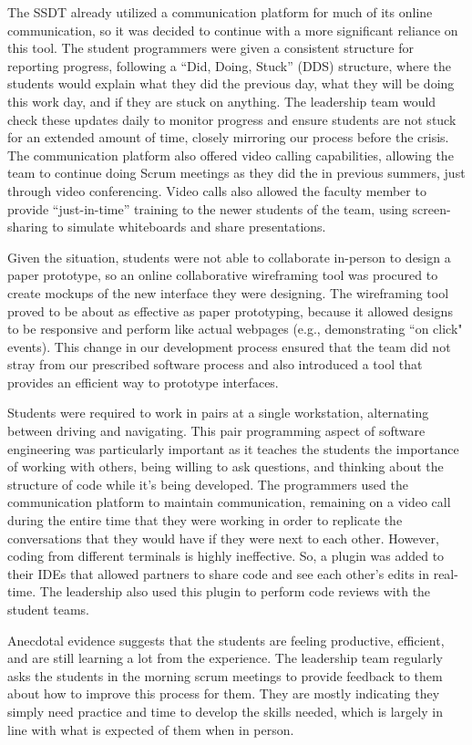The SSDT already utilized a communication platform for much of its online communication, so it was decided to continue with a more significant reliance on this tool. The student programmers were given a consistent structure for reporting progress, following a ``Did, Doing, Stuck'' (DDS) structure, where the students would explain what they did the previous day, what they will be doing this work day, and if they are stuck on anything. The leadership team would check these updates daily to monitor progress and ensure students are not stuck for an extended amount of time, closely mirroring our process before the crisis. The communication platform also offered video calling capabilities, allowing the team to continue doing Scrum meetings as they did the in previous summers, just through video conferencing. Video calls also allowed the faculty member to provide ``just-in-time'' training to the newer students of the team, using screen-sharing to simulate whiteboards and share presentations.

Given the situation, students were not able to collaborate in-person to design a paper prototype, so an online collaborative wireframing tool was procured to create mockups of the new interface they were designing. The wireframing tool proved to be about as effective as paper prototyping, because it allowed designs to be responsive and perform like actual webpages (e.g., demonstrating ``on click" events). This change in our development process ensured that the team did not stray from our prescribed software process and also introduced a tool that provides an efficient way to prototype interfaces.

Students were required to work in pairs at a single workstation, alternating between driving and navigating. This pair programming aspect of software engineering was particularly important as it teaches the students the importance of working with others, being willing to ask questions, and thinking about the structure of code while it's being developed. The programmers used the communication platform to maintain communication, remaining on a video call during the entire time that they were working in order to replicate the conversations that they would have if they were next to each other. However, coding from different terminals is highly ineffective. So, a plugin was added to their IDEs that allowed partners to share code and see each other's edits in real-time. The leadership also used this plugin to perform code reviews with the student teams.

Anecdotal evidence suggests that the students are feeling productive, efficient, and are still learning a lot from the experience. The leadership team regularly asks the students in the morning scrum meetings to provide feedback to them about how to improve this process for them. They are mostly indicating they simply need practice and time to develop the skills needed, which is largely in line with what is expected of them when in person.

